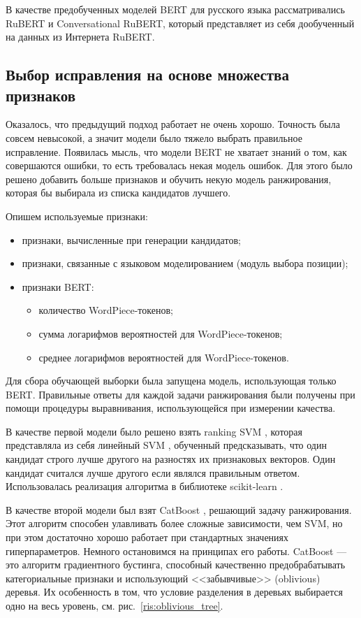 В качестве предобученных моделей BERT для русского языка рассматривались RuBERT \cite{Kuratov2019} и Conversational RuBERT, который представляет из себя дообученный на данных из Интернета RuBERT.

\subsection{Выбор исправления на основе множества признаков}

Оказалось, что предыдущий подход работает не очень хорошо. Точность была совсем невысокой, а значит модели было тяжело выбрать правильное исправление. Появилась мысль, что модели BERT не хватает знаний о том, как совершаются ошибки, то есть требовалась некая модель ошибок. Для этого было решено добавить больше признаков и обучить некую модель ранжирования, которая бы выбирала из списка кандидатов лучшего. 

Опишем используемые признаки:
\begin{itemize}
	\item признаки, вычисленные при генерации кандидатов;
	\item признаки, связанные с языковом моделированием (модуль выбора позиции);
	\item признаки BERT:
	\begin{itemize}
		\item количество WordPiece-токенов;
		\item сумма логарифмов вероятностей для WordPiece-токенов;
		\item среднее логарифмов вероятностей для WordPiece-токенов.
	\end{itemize}
\end{itemize}

Для сбора обучающей выборки была запущена модель, использующая только BERT. Правильные ответы для каждой задачи ранжирования были получены при помощи процедуры выравнивания, использующейся при измерении качества.

В качестве первой модели было решено взять ranking SVM \cite{Joachims2002}, которая представляла из себя линейный SVM \cite{Boser1992}, обученный предсказывать, что один кандидат строго лучше другого на разностях их признаковых векторов. Один кандидат считался лучше другого если являлся правильным ответом. Использовалась реализация алгоритма в библиотеке scikit-learn \cite{Pedregosa2012}.

В качестве второй модели был взят CatBoost  \cite{Dorogush2018}, решающий задачу ранжирования. Этот алгоритм способен улавливать более сложные зависимости, чем SVM, но при этом достаточно хорошо работает при стандартных значениях гиперпараметров. Немного остановимся на принципах его работы. CatBoost --- это алгоритм градиентного бустинга, способный качественно предобрабатывать категориальные признаки и использующий <<забывчивые>> (oblivious) деревья. Их особенность в том, что условие разделения в деревьях выбирается одно на весь уровень, см. рис.~\ref{ris:oblivious_tree}.

